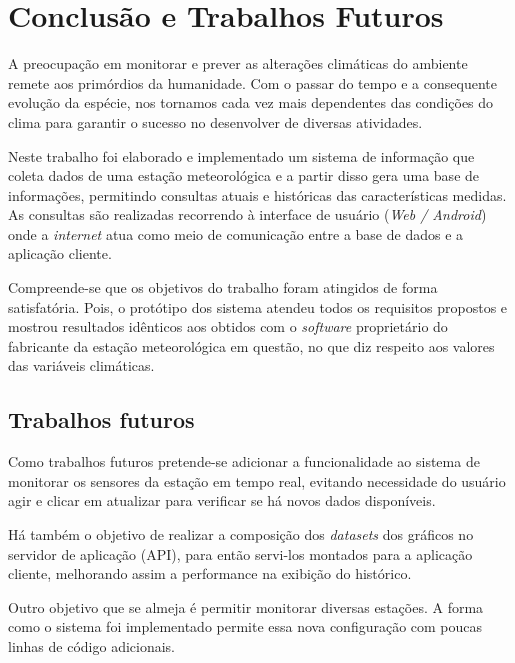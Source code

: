 \chapter{Conclusão e Trabalhos Futuros}


A preocupação em monitorar e prever as alterações climáticas do ambiente remete aos primórdios da humanidade. Com o passar do tempo e a consequente evolução da espécie, nos tornamos cada vez mais dependentes das condições do clima para garantir o sucesso no desenvolver de diversas atividades.

Neste trabalho foi elaborado e implementado um sistema de informação que coleta dados de uma estação meteorológica e a partir disso gera uma base de informações, permitindo consultas atuais e históricas das características medidas. As consultas são realizadas recorrendo à interface de usuário (\textit{Web / Android}) onde a \textit{internet} atua como meio de comunicação entre a base de dados e a aplicação cliente.

Compreende-se que os objetivos do trabalho foram atingidos de forma satisfatória. Pois, o protótipo dos sistema atendeu todos os requisitos propostos e mostrou resultados idênticos aos obtidos com o \textit{software} proprietário do fabricante da estação meteorológica em questão, no que diz respeito aos valores das variáveis climáticas.
 
\section{Trabalhos futuros}

Como trabalhos futuros pretende-se adicionar a funcionalidade ao sistema de monitorar os sensores da estação em tempo real, evitando necessidade do usuário agir e clicar em atualizar para verificar se há novos dados disponíveis.

Há também o objetivo de realizar a composição dos \textit{datasets} dos gráficos no servidor de aplicação (API), para então servi-los montados para a aplicação cliente,  melhorando assim a performance na exibição do histórico. 

Outro objetivo que se almeja é permitir monitorar diversas estações. A forma como o sistema foi implementado permite essa nova configuração com poucas linhas de código adicionais.